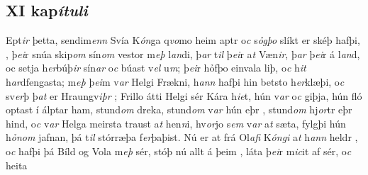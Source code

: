 \subsection*{XI kap\textit{ítuli}} 
Ept\textit{ir} þetta,  sendim\textit{enn} Svía K\textit{ón}ga q\textit{vo}mo heim aptr  o\textit{c} s\textit{ỏgþo} slíkt er skéþ hafþi,  
, þ\textit{ei}r snúa skip\textit{om} sín\textit{om} vestor
m\textit{eþ} l\textit{an}di, þ\textit{ar} t\textit{il} þ\textit{ei}r   a\textit{t} Væn\textit{ir}, þ\textit{ar}  þ\textit{ei}r á l\textit{an}d, oc  setja
h\textit{er}búþ\textit{ir} sín\textit{ar} o\textit{c} búast v\textit{el}
u\textit{m}; þ\textit{ei}r hỏfþo einvala liþ,  o\textit{c}
h\textit{it}  h\textit{ar}dfengasta; 
m\textit{eþ}
þ\textit{ei}m v\textit{ar} Helgi   Frækni, h\textit{ann} hafþi hin betsto h\textit{er}klæþi, o\textit{c} sv\textit{er}þ
þ\textit{at} er Hraungv\textit{iþr} ; 
Frillo átti Helgi sér   Kára h\textit{ie}t, 
hún v\textit{ar}  o\textit{c}  giþja, 
hún fló optast í  álptar  ham,   stund\textit{om} dreka,   stund\textit{om} v\textit{ar} hún   eþr  , 
stund\textit{om} hj\textit{or}tr eþr hind, o\textit{c} v\textit{ar}
Helga   meirsta  traust a\textit{t} hen\textit{n}i, hv\textit{or}jo
s\textit{em} v\textit{ar} a\textit{t} sæta, fylgþi hún h\textit{ỏnom}
jafnan, þá   
t\textit{il}  stórræþa f\textit{er}þa\-þist. 
Nú er at   frá Ol\textit{afi} K\textit{óngi} 
a\textit{t} h\textit{ann} heldr  , 
o\textit{c} hafþi  þá Bíld og Vola m\textit{eþ} sér, stóþ nú
allt   á  þeim  , láta þ\textit{ei}r m\textit{ic}it af sér, o\textit{c} heita
